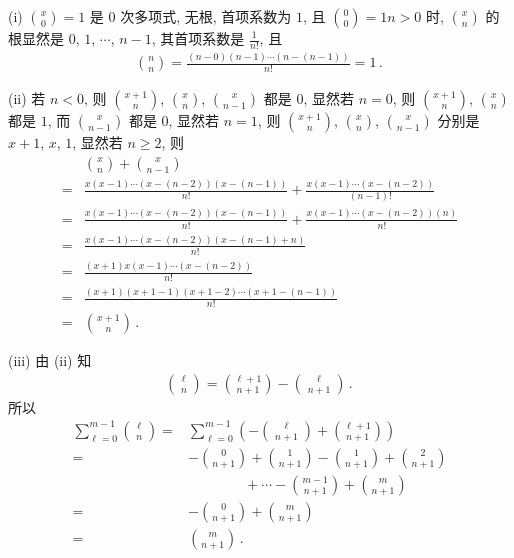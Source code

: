 \begin{pf}
    (i) $\binom{x}{0} = 1$ 是 $0$ 次多项式, 无根, 首项系数为 $1$, 且 $\binom{0}{0} = 1$\period $n > 0$ 时, $\binom{x}{n}$ 的根显然是 $0$, $1$, $\cdots$, $n-1$, 其首项系数是 $\frac{1}{n!}$, 且
    \begin{align*}
        \binom{n}{n} = \frac{(n-0)(n-1) \cdots (n - (n-1))}{n!} = 1 \period
    \end{align*}

    (ii) 若 $n<0$, 则 $\binom{x + 1}{n}$, $\binom{x}{n}$, $\binom{x}{n - 1}$ 都是 $0$, 显然\period 若 $n=0$, 则 $\binom{x + 1}{n}$, $\binom{x}{n}$ 都是 $1$, 而 $\binom{x}{n - 1}$ 都是 $0$, 显然\period 若 $n = 1$, 则 $\binom{x + 1}{n}$, $\binom{x}{n}$, $\binom{x}{n - 1}$ 分别是 $x+1$, $x$, $1$, 显然\period 若 $n \geq 2$, 则
    \begin{align*}
             & \binom{x}{n} + \binom{x}{n - 1}                                                      \\
        = {} & \frac{x(x-1) \cdots (x-(n-2))(x-(n-1))}{n!} + \frac{x(x-1) \cdots (x-(n-2))}{(n-1)!} \\
        = {} & \frac{x(x-1) \cdots (x-(n-2))(x-(n-1))}{n!} + \frac{x(x-1) \cdots (x-(n-2))(n)}{n!}  \\
        = {} & \frac{x(x-1) \cdots (x-(n-2))(x-(n-1) + n)}{n!}                                      \\
        = {} & \frac{(x+1)x(x-1) \cdots (x-(n-2))}{n!}                                              \\
        = {} & \frac{(x+1)(x+1-1)(x+1-2) \cdots (x+1-(n-1))}{n!}                                    \\
        = {} & \binom{x + 1}{n} \period
    \end{align*}

    (iii) 由 (ii) 知
    \begin{align*}
        \binom{\ell}{n} = \binom{\ell + 1}{n + 1} - \binom{\ell}{n + 1} \period
    \end{align*}
    所以
    \begin{align*}
        \sum_{\ell = 0}^{m - 1} \binom{\ell}{n}
        = {} & \sum_{\ell = 0}^{m - 1} \left(-\binom{\ell}{n + 1}
        + \binom{\ell + 1}{n + 1} \right)                             \\
        = {} & -\binom{0}{n + 1} + \binom{1}{n + 1} -\binom{1}{n + 1}
        + \binom{2}{n + 1}                                            \\
             & \qquad \qquad
        + \cdots -\binom{m-1}{n + 1} + \binom{m}{n + 1}               \\
        = {} & -\binom{0}{n + 1} + \binom{m}{n + 1}                   \\
        = {} & \binom{m}{n + 1} \period
    \end{align*}


\end{pf}
